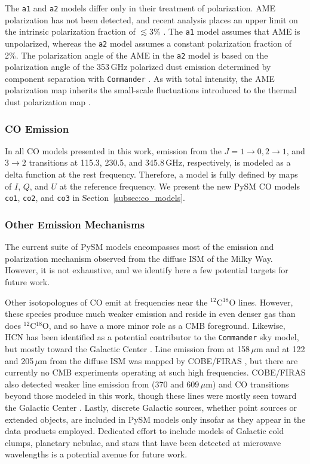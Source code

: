 \documentclass[twocolumn]{aastex631}
\begin{document}
The \texttt{a1} and \texttt{a2} models differ only in their treatment of polarization. AME polarization has not been detected, and recent analysis places an upper limit on the intrinsic polarization fraction of $\lesssim3$\% \citep{Herman:2023}. The \texttt{a1} model assumes that AME is unpolarized, whereas the \texttt{a2} model assumes a constant polarization fraction of 2\%. The polarization angle of the AME in the \texttt{a2} model is based on the polarization angle of the 353\,GHz polarized dust emission determined by component separation with \texttt{Commander} \citep{planck2014-a12}. As with total intensity, the AME polarization map inherits the small-scale fluctuations introduced to the thermal dust polarization map \citep[see][for details]{Thorne:2017}.

\subsubsection{CO Emission}
In all CO models presented in this work, emission from the $J = 1\rightarrow0, 2\rightarrow1$, and $3\rightarrow2$ transitions at 115.3, 230.5, and 345.8\,GHz, respectively, is modeled as a delta function at the rest frequency. Therefore, a model is fully defined by maps of $I$, $Q$, and $U$ at the reference frequency. We present the new PySM CO models \texttt{co1}, \texttt{co2}, and \texttt{co3} in Section~\ref{subsec:co_models}.

\subsubsection{Other Emission Mechanisms}
The current suite of PySM models encompasses most of the emission and polarization mechanism observed from the diffuse ISM of the Milky Way. However, it is not exhaustive, and we identify here a few potential targets for future work.

Other isotopologues of CO emit at frequencies near the $^{12}$C$^{18}$O lines. However, these species produce much weaker emission and reside in even denser gas than does $^{12}$C$^{18}$O, and so have a more minor role as a CMB foreground. Likewise, HCN has been identified as a potential contributor to the \texttt{Commander} sky model, but mostly toward the Galactic Center \citep{planck2014-a12}. Line emission from  at 158\,$\mu$m and  at 122 and 205\,$\mu$m from the diffuse ISM was mapped by COBE/FIRAS \citep{Bennett:1994}, but there are currently no CMB experiments operating at such high frequencies. COBE/FIRAS also detected weaker line emission from  (370 and 609\,$\mu$m) and CO transitions beyond those modeled in this work, though these lines were mostly seen toward the Galactic Center \citep{Bennett:1994}. Lastly, discrete Galactic sources, whether point sources or extended objects, are included in PySM models only insofar as they appear in the data products employed. Dedicated effort to include models of Galactic cold clumps, planetary nebulae, and stars that have been detected at microwave wavelengths is a potential avenue for future work. 
\end{document}
